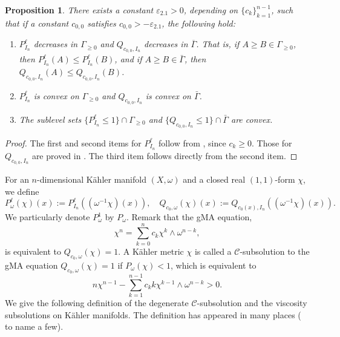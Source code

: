 \documentclass[10pt,a4paper]{amsart}
\numberwithin{equation}{section}
\newtheorem{prop}[equation]{Proposition}
\begin{document}
\begin{prop}\label{prop:properties}
    There exists a constant $\varepsilon_{2.1}>0$, depending on $\{c_k\}_{k=1}^{n-1}$, such that if a constant $c_{0,0}$ satisfies $c_{0,0}>-\varepsilon_{2.1}$, the following hold:
    \begin{enumerate}[label={\upshape(\roman*)}]
        \item\label{item:monotonicity} $P^\ell_{I_n}$ decreases in $\Gamma_{\ge0}$ and $Q_{c_{0,0},I_n}$ decreases in $\overline{\Gamma}$. That is, if $A\ge B\in\Gamma_{\ge0}$, then $P^\ell_{I_n}(A)\le P^\ell_{I_n}(B)$, and if $A\ge B\in\bar{\Gamma}$, then $Q_{c_{0,0},I_n}(A)\le Q_{c_{0,0},I_n}(B)$.
        \item $P^\ell_{I_n}$ is convex on $\Gamma_{\ge0}$ and $Q_{c_{0,0},I_n}$ is convex on $\bar{\Gamma}$.
        \item\label{item:sublevel} The sublevel sets $\{P^\ell_{I_n}\le1\}\cap\Gamma_{\ge0}$ and $\{Q_{c_{0,0},I_n}\le1\}\cap\bar{\Gamma}$ are convex.
    \end{enumerate}
\end{prop}

\begin{proof}
    The first and second items for $P^\ell_{I_n}$ follow from \cite[Lemmas 7 and 8]{CS17}, since $c_k\ge0$. Those for $Q_{c_{0,0},I_n}$ are proved in \cite[Lemma 2.2 (3) and (5)]{Datar-Pingali}. The third item follows directly from the second item. 
\end{proof}

For an $n$-dimensional Kähler manifold $(X,\omega)$ and a closed real $(1,1)$-form $\chi$,
we define
\begin{equation}\label{eq:PQ}
    P^\ell_\omega(\chi)(x) := P^\ell_{I_n}((\omega^{-1}\chi)(x)), \quad
Q_{c_0,\omega}(\chi) (x) := Q_{c_0(x),I_n}((\omega^{-1}\chi)(x)).
\end{equation}
We particularly denote $P^1_\omega$ by $P_\omega$.
Remark that the gMA equation,
\begin{equation*}
    \chi^n=\sum_{k=0}^n c_k\chi^k\wedge\omega^{n-k},
\end{equation*}
is equivalent to $Q_{c_0,\omega}(\chi)=1$.
A Kähler metric $\chi$ is called a $\mathcal{C}$-subsolution to the gMA equation $Q_{c_0,\omega}(\chi)=1$ if $P_{\omega}(\chi)<1$, which is equivalent to
\begin{equation*}
    n\chi^{n-1}-\sum_{k=1}^{n-1}c_k k\chi^{k-1}\wedge\omega^{n-k}>0.
\end{equation*}
We give the following definition of the degenerate $\mathcal{C}$-subsolution and the viscosity subsolutions on K{\"a}hler manifolds.
The definition has appeared in many places (\cite{EGZ,CS17,DDT,CX25a,CX25b} to name a few).
\end{document}
